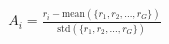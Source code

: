 \documentclass[preview]{standalone}
\begin{document}
\begin{align*}
A_i = \frac{r_i - \text{mean}\left(\{r_1, r_2, \ldots, r_G\}\right)}{\text{std}\left(\{r_1, r_2, \ldots, r_G\}\right)}
\end{align*}
\end{document}
